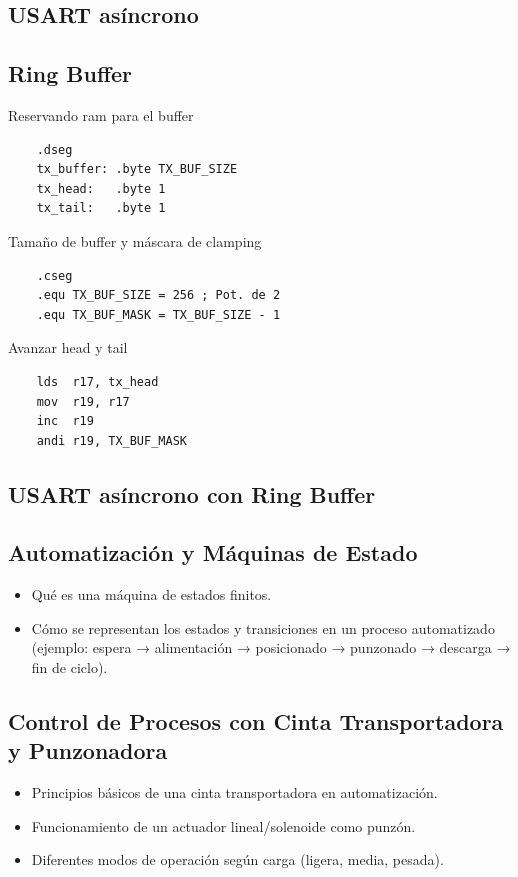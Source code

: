 \subsection{USART asíncrono}
\subsection{Ring Buffer}

Reservando ram para el buffer
\begin{verbatim}
    .dseg 
    tx_buffer: .byte TX_BUF_SIZE  
    tx_head:   .byte 1            
    tx_tail:   .byte 1
\end{verbatim}

Tamaño de buffer y máscara de clamping

\begin{verbatim}
    .cseg
    .equ TX_BUF_SIZE = 256 ; Pot. de 2
    .equ TX_BUF_MASK = TX_BUF_SIZE - 1
\end{verbatim}

Avanzar head y tail
\begin{verbatim}
    lds  r17, tx_head
    mov  r19, r17
    inc  r19
    andi r19, TX_BUF_MASK 
\end{verbatim}



\subsection{USART asíncrono con Ring Buffer}



\subsection{Automatización y Máquinas de Estado}
\begin{itemize}
    \item Qué es una máquina de estados finitos.
    \item Cómo se representan los estados y transiciones en un proceso automatizado (ejemplo: espera → alimentación → posicionado → punzonado → descarga → fin de ciclo).
\end{itemize}


\subsection{Control de Procesos con Cinta Transportadora y Punzonadora}
\begin{itemize}
    \item Principios básicos de una cinta transportadora en automatización.
    \item Funcionamiento de un actuador lineal/solenoide como punzón.
    \item Diferentes modos de operación según carga (ligera, media, pesada).
\end{itemize}


